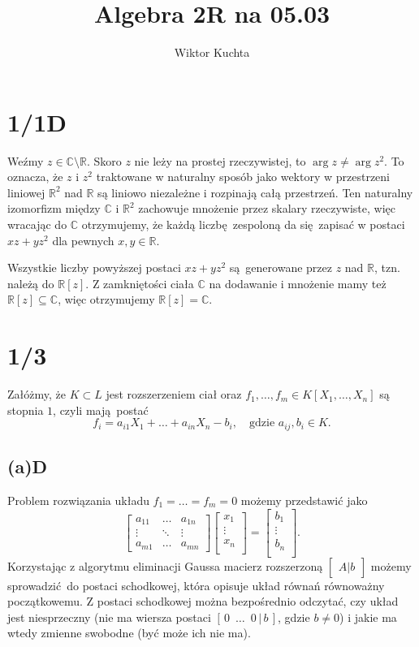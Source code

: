 \documentclass[a4paper, 12pt]{article}
\title{Algebra 2R na 05.03}
\author{Wiktor Kuchta}
\date{\vspace{-4ex}}
\newcommand{\+}{\enspace}
\begin{document}
\maketitle

\section*{1/1D}
Weźmy $z ∈ ℂ \setminus ℝ$.
Skoro $z$ nie leży na prostej rzeczywistej, to $\arg z ≠ \arg z^2$.
To oznacza, że $z$ i $z^2$ traktowane w naturalny sposób jako wektory w
przestrzeni liniowej $ℝ^2$ nad $ℝ$ są liniowo niezależne i rozpinają całą
przestrzeń.
Ten naturalny izomorfizm między $ℂ$ i $ℝ^2$ zachowuje mnożenie przez skalary
rzeczywiste, więc wracając do $ℂ$ otrzymujemy, że każdą liczbę zespoloną
da się zapisać w postaci $xz + yz^2$ dla pewnych $x,y ∈ ℝ$.

Wszystkie liczby powyższej postaci $xz + yz^2$ są generowane przez $z$ nad $ℝ$,
tzn. należą do $ℝ[z]$.
Z zamkniętości ciała $ℂ$ na dodawanie i mnożenie mamy też $ℝ[z] ⊆ ℂ$,
więc otrzymujemy $ℝ[z] = ℂ$.

\section*{1/3}
Załóżmy, że $K ⊂ L$ jest rozszerzeniem ciał oraz $f_1, …, f_m ∈ K[X_1, …, X_n]$
są stopnia $1$, czyli mają postać
$$f_i = a_{i1}X_1 + … + a_{in}X_n - b_{i}, \quad \text{gdzie }a_{ij}, b_i ∈ K.$$

\subsection*{(a)D}
Problem rozwiązania układu $f_1 = … = f_m = 0$ możemy przedstawić jako
$$
\begin{bmatrix}
	a_{11} & \dots  & a_{1n} \\
	\vdots & \ddots & \vdots \\
	a_{m1} & \dots  & a_{mn}
\end{bmatrix}
\begin{bmatrix}
	x_{1} \\
	\vdots \\
	x_{n} \\
\end{bmatrix}
=
\begin{bmatrix}
	b_{1} \\
	\vdots \\
	b_{n} \\
\end{bmatrix}.
$$
Korzystając z algorytmu eliminacji Gaussa macierz rozszerzoną
$\begin{bmatrix}A \big\vert b\end{bmatrix}$
możemy sprowadzić do postaci schodkowej,
która opisuje układ równań równoważny początkowemu.
Z postaci schodkowej można bezpośrednio odczytać, czy układ jest niesprzeczny
(nie ma wiersza postaci $[\, 0 \+ … \+ 0 \, \vert \, b \,]$, gdzie $b ≠ 0$) i
jakie ma wtedy zmienne swobodne (być może ich nie ma).
\end{document}
